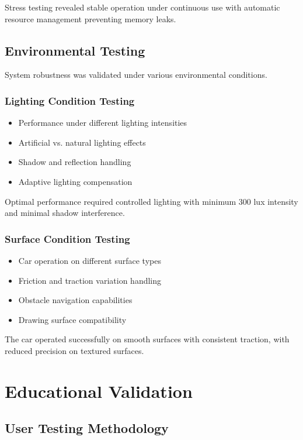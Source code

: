 Stress testing revealed stable operation under continuous use with automatic resource management preventing memory leaks.

\subsection{Environmental Testing}

System robustness was validated under various environmental conditions.

\subsubsection{Lighting Condition Testing}
\begin{itemize}
    \item Performance under different lighting intensities
    \item Artificial vs. natural lighting effects
    \item Shadow and reflection handling
    \item Adaptive lighting compensation
\end{itemize}

Optimal performance required controlled lighting with minimum 300 lux intensity and minimal shadow interference.

\subsubsection{Surface Condition Testing}
\begin{itemize}
    \item Car operation on different surface types
    \item Friction and traction variation handling
    \item Obstacle navigation capabilities
    \item Drawing surface compatibility
\end{itemize}

The car operated successfully on smooth surfaces with consistent traction, with reduced precision on textured surfaces.

\section{Educational Validation}

\subsection{User Testing Methodology}

